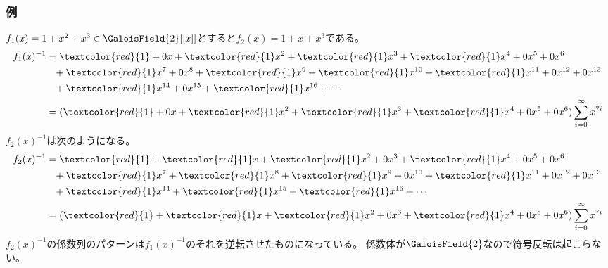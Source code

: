             \subsubsection{例}
                \newcommand{\redtext}[1]{\textcolor{red}{#1}}
                $f_1(x) = 1+x^2+x^3 \in \GaloisField{2}[[x]]$とすると$f_2(x) = 1+x+x^3$である。
                \begin{align*}
                    f_1(x)^{-1} &= \redtext{1} + 0x + \redtext{1}x^2 + \redtext{1}x^3 + \redtext{1}x^4 + 0x^5 + 0x^6 \\
                    &\phantom{=}+ \redtext{1}x^7 + 0x^8 + \redtext{1}x^9 + \redtext{1}x^{10} + \redtext{1}x^{11} + 0x^{12} + 0x^{13} \\
                    &\phantom{=}+ \redtext{1}x^{14} + 0x^{15} + \redtext{1}x^{16} + \dotsb \\
                    &= (\redtext{1} + 0x + \redtext{1}x^2 + \redtext{1}x^3 + \redtext{1}x^4 + 0x^5 + 0x^6) \sum_{i=0}^\infty x^{7i}
                \end{align*}
                $f_2(x)^{-1}$は次のようになる。
                \begin{align*}
                    f_2(x)^{-1} &= \redtext{1} + \redtext{1}x + \redtext{1}x^2 + 0x^3 + \redtext{1}x^4 + 0x^5 + 0x^6 \\
                    &\phantom{=}+ \redtext{1}x^7 + \redtext{1}x^8 + \redtext{1}x^9 + 0x^{10} + \redtext{1}x^{11} + 0x^{12} + 0x^{13} \\
                    &\phantom{=}+ \redtext{1}x^{14} + \redtext{1}x^{15} + \redtext{1}x^{16} + \dotsb \\
                    &= (\redtext{1} + \redtext{1}x + \redtext{1}x^2 + 0x^3 + \redtext{1}x^4 + 0x^5 + 0x^6) \sum_{i=0}^\infty x^{7i}
                \end{align*}
                $f_2(x)^{-1}$の係数列のパターンは$f_1(x)^{-1}$のそれを逆転させたものになっている。
                係数体が$\GaloisField{2}$なので符号反転は起こらない。

